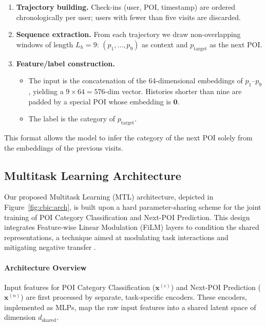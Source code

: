 \begin{enumerate}
  \item \textbf{Trajectory building.}  Check-ins (user, POI, timestamp) are ordered chronologically per user; users with fewer than five visits are discarded.
  \item \textbf{Sequence extraction.}  From each trajectory we draw non-overlapping windows of length $L_h\!=\!9$: $(p_1,\dots,p_9)$ as context and $p_{\text{target}}$ as the next POI.
  \item \textbf{Feature/label construction.}
    \begin{itemize}
      \item The input is the concatenation of the 64-dimensional embeddings of $p_1$--$p_9$, yielding a $9\!\times\!64=576$-dim vector.
            Histories shorter than nine are padded by a special POI whose embedding is $\mathbf{0}$.
      \item The label is the category of $p_{\text{target}}$.
    \end{itemize}
\end{enumerate}

This format allows the model to infer the category of the next POI solely from the embeddings of the previous visits.

\subsection{Multitask Learning Architecture}
\label{sec:cbic:mtlarch}

Our proposed Multitask Learning (MTL) architecture, depicted in Figure~\ref{fig:cbic:arch}, is built upon a hard parameter-sharing scheme for the joint training of POI Category Classification and Next-POI Prediction. This design integrates Feature-wise Linear Modulation (FiLM) layers to condition the shared representations, a technique aimed at modulating task interactions and mitigating negative transfer \cite{perez2018film,standley2020tasks}.

\paragraph*{Architecture Overview}
Input features for POI Category Classification ($\mathbf{x}^{(c)}$) and Next-POI Prediction ($\mathbf{x}^{(n)}$) are first processed by separate, task-specific encoders. These encoders, implemented as MLPs, map the raw input features into a shared latent space of dimension $d_{\mathrm{shared}}$.

